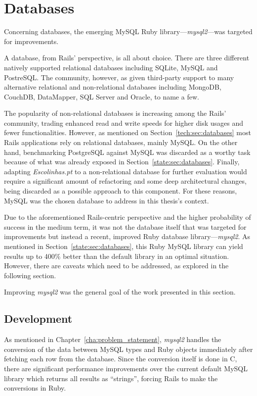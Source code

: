 \section{Databases} %
\label{solution:sec:databases}

Concerning databases, the emerging MySQL Ruby library---\textit{mysql2}---was targeted for improvements.

A database, from Rails' perspective, is all about choice. There are three different natively supported relational databases including SQLite, MySQL and PostreSQL. The community, however, as given third-party support to many alternative relational and non-relational databases including MongoDB, CouchDB, DataMapper, SQL Server and Oracle, to name a few.

The popularity of non-relational databases is increasing among the Rails' community, trading enhanced read and write speeds for higher disk usages and fewer functionalities. However, as mentioned on Section~\ref{tech:sec:databases} most Rails applications rely on relational databases, mainly MySQL. On the other hand, benchmarking PostgreSQL against MySQL was discarded as a worthy task because of what was already exposed in Section~\ref{state:sec:databases}. Finally, adapting \textit{Escolinhas.pt} to a non-relational database for further evaluation would require a significant amount of refactoring and some deep architectural changes, being discarded as a possible approach to this component. For these reasons, MySQL was the chosen database to address in this thesis's context.

Due to the aforementioned Rails-centric perspective and the higher probability of success in the medium term, it was not the database itself that was targeted for improvements but instead a recent, improved Ruby database library---\textit{mysql2}. As mentioned in Section~\ref{state:sec:databases}, this Ruby MySQL library can yield results up to 400\% better than the default library in an optimal situation. However, there are caveats which need to be addressed, as explored in the following section.

Improving \textit{mysql2} was the general goal of the work presented in this section.

\subsection{Development}
As mentioned in Chapter~\ref{cha:problem_statement}, \textit{mysql2} handles the conversion of the data between MySQL types and Ruby objects immediately after fetching each row from the database. Since the conversion itself is done in C, there are significant performance improvements over the current default MySQL library which returns all results as ``strings'', forcing Rails to make the conversions in Ruby. 

